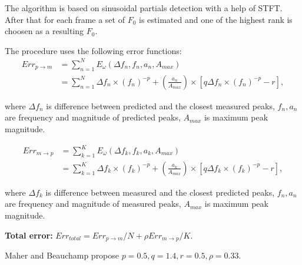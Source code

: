 The algorithm is based on sinusoidal partials detection with a help of STFT.
After that for each frame a set of $F_0$ is estimated and one of the highest
rank is choosen as a resulting $F_0$.

The procedure uses the following error functions:
\begin{align}
  Err_{p \to m} &= \sum_{n=1}^N E_\omega (\Delta f_n, f_n, a_n, A_{max}) \\
                &= \sum_{n=1}^N \Delta f_n \times (f_n) ^{-p} +
                       (\frac{a_n}{A_{max}}) \times [q \Delta f_n \times
                       (f_n)^{-p} - r],
\end{align}

where $\Delta f_n$ is difference between predicted and the closest measured
peaks, $f_n, a_n$ are frequency and magnitude of predicted peaks,
$A_{max}$ is maximum peak magnitude.

\begin{align}
  Err_{m \to p} &= \sum_{k=1}^K E_\omega (\Delta f_k, f_k, a_k, A_{max}) \\
                &= \sum_{k=1}^K \Delta f_k \times (f_k) ^{-p} +
                       (\frac{a_k}{A_{max}}) \times [q \Delta f_k \times
                       (f_k)^{-p} - r],
\end{align}

where $\Delta f_k$ is difference between measured and the closest predicted
peaks, $f_n, a_n$ are frequency and magnitude of measured peaks,
$A_{max}$ is maximum peak magnitude.

\textbf{Total error:} $Err_{total} = Err_{p \to m}/N + \rho Err_{m \to p}/K$.

Maher and Beauchamp propose $p=0.5, q=1.4, r=0.5, \rho=0.33$.
